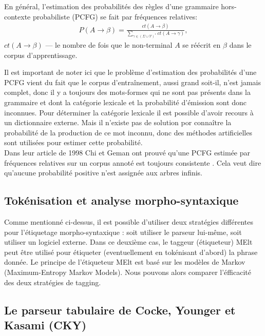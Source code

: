 \documentclass[12pt]{article}
\begin{document}
En général, l'estimation des probabilités des règles d'une grammaire
hors-contexte probabiliste (PCFG) se fait par fréquences relatives:
\begin{eqnarray}
P(A \rightarrow \beta) = \frac{ct(A \rightarrow \beta)}{\sum\limits_{\gamma \in (\Sigma \cup \mathcal{V})^*}{ct(A \rightarrow \gamma)}},
\end{eqnarray}
$ct(A \rightarrow \beta)$ --- le nombre de fois que le non-terminal $A$ se
réécrit en $\beta$ dans le corpus d'apprentissage.

Il est important de noter ici que le problème d'estimation des probabilités
d'une PCFG vient du fait que le corpus d'entraînement, aussi grand soit-il,
n'est jamais complet, donc il y a toujours des mots-formes qui ne sont pas
présents dans la grammaire et dont la catégorie lexicale et la
probabilité d'émission sont donc inconnues. Pour déterminer la catégorie
lexicale il est possible d'avoir recours à un dictionnaire externe. Mais il
n'existe pas de solution por connaître la probabilité de la production de ce
mot inconnu, donc des méthodes artificielles sont utilisées pour estimer
cette probabilité.\\

Dans leur article de 1998 Chi et Geman ont prouvé qu'une PCFG estimée par
fréquences relatives sur un corpus annoté est toujours consistente
\cite{proper_PCFG_estimation}. Cela veut dire qu'aucune probabilité positive
n'est assignée aux arbres infinis.

\subsection{Tokénisation et analyse morpho-syntaxique}

Comme mentionné ci-dessus, il est possible d'utiliser deux stratégies
différentes pour l'étiquetage morpho-syntaxique : soit utiliser le parseur
lui-même, soit utiliser un logiciel externe. Dans ce deuxième cas, le taggeur
(étiqueteur) MElt \cite{MElt} peut être utilisé pour étiqueter (eventuellement
en tokénisant d'abord) la phrase donnée. Le principe de l'étiqueteur MElt est
basé sur les modèles de Markov (Maximum-Entropy Markov Models). 
Nous pouvons alors comparer l'éfficacité des deux stratégies de tagging.

\subsection{Le parseur tabulaire de Cocke, Younger et Kasami (CKY)}
\end{document}
